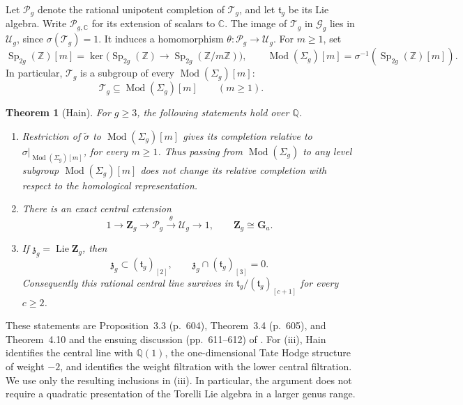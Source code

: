 \documentclass[11pt,a4paper]{article}
\newtheorem{theorem}{Theorem}[section]
\theoremstyle{definition}
\newcommand{\Q}{\mathbb Q}
\newcommand{\Z}{\mathbb Z}
\newcommand{\C}{\mathbb C}
\newcommand{\Mod}{\operatorname{Mod}}
\newcommand{\Sp}{\operatorname{Sp}}
\newcommand{\Ga}{\mathbf G_a}
\newcommand{\Lie}{\operatorname{Lie}}
\begin{document}
Let \(\mathscr{P}_g\) denote the rational unipotent completion
of \(\mathcal{T}_g\), and let \(\mathfrak t_g\) be its Lie algebra.
Write \(\mathscr{P}_{g,\C}\) for its extension of scalars to \(\C\).
The image of \(\mathcal{T}_g\) in \(\mathcal G_g\) lies
in \(\mathcal U_g\), since \(\sigma(\mathcal{T}_g)=1\). It induces a
homomorphism \(\theta:\mathscr{P}_g\to\mathcal U_g\). For
\(m\ge1\), set
\[
 \Sp_{2g}(\Z)[m]=\ker\bigl(\Sp_{2g}(\Z)
                  \to\Sp_{2g}(\Z/m\Z)\bigr),\qquad
 \Mod(\Sigma_g)[m]=\sigma^{-1}(\Sp_{2g}(\Z)[m]).
\]
In particular, \(\mathcal{T}_g\) is a subgroup of every \(\Mod(\Sigma_g)[m]\):
\[
 \mathcal{T}_g\subseteq\Mod(\Sigma_g)[m]\qquad(m\ge1).
\]

\begin{theorem}[Hain]\label{thm:hainkernel}
For \(g\ge3\), the following statements hold over \(\Q\).
\begin{enumerate}[label=(\roman*)]
\item Restriction of \(\widetilde\sigma\) to \(\Mod(\Sigma_g)[m]\) gives
      its completion relative to \(\sigma|_{\Mod(\Sigma_g)[m]}\), for every
      \(m\ge1\). Thus passing from \(\Mod(\Sigma_g)\) to any level subgroup
      \(\Mod(\Sigma_g)[m]\) does not change its relative completion
      with respect to the homological representation.
\item There is an exact central extension
      \[
       1\longrightarrow\mathbf Z_g\longrightarrow\mathscr{P}_g
       \xrightarrow{\theta}\mathcal U_g\longrightarrow1,
       \qquad \mathbf Z_g\cong\Ga.
      \]
\item If \(\mathfrak z_g=\Lie\mathbf Z_g\), then
      \[
       \mathfrak z_g\subset(\mathfrak t_g)_{[2]},
       \qquad
       \mathfrak z_g\cap(\mathfrak t_g)_{[3]}=0.
      \]
      Consequently this rational central line survives in
      \(\mathfrak t_g/(\mathfrak t_g)_{[c+1]}\) for every
      \(c\ge2\).
\end{enumerate}
\end{theorem}

These statements are Proposition~3.3 (p.~604), Theorem~3.4 (p.~605),
and Theorem~4.10 and the ensuing discussion (pp.~611--612) of
\cite{Hain}. For (iii), Hain identifies the central line with
\(\Q(1)\), the one-dimensional Tate Hodge structure of weight
\(-2\), and identifies the weight filtration with the lower central
filtration. We use only the resulting inclusions in (iii). In
particular, the argument does not require a quadratic presentation
of the Torelli Lie algebra in a larger genus range.
\end{document}
